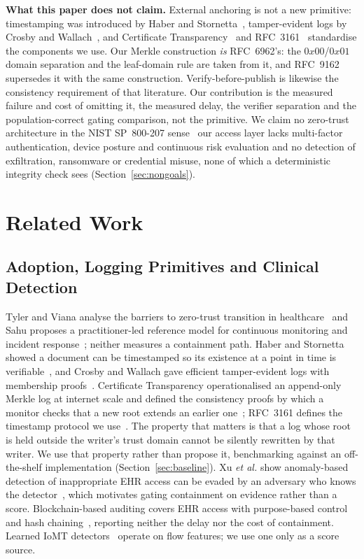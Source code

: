 \documentclass[conference]{IEEEtran}
\begin{document}
\noindent\textbf{What this paper does not claim.} External anchoring is not a new primitive:
timestamping was introduced by Haber and Stornetta~\cite{haber}, tamper-evident logs by Crosby and
Wallach~\cite{crosby}, and Certificate Transparency~\cite{rfc6962} and RFC~3161~\cite{rfc3161}
standardise the components we use. Our Merkle construction \emph{is} RFC~6962's: the $0x00$/$0x01$ domain
separation and the leaf-domain rule are taken from it, and RFC~9162~\cite{rfc9162} supersedes it with the same
construction. Verify-before-publish is likewise the consistency requirement of that literature. Our
contribution is the measured failure and cost of omitting it, the measured delay, the verifier separation and
the population-correct gating comparison, not the primitive. We claim no zero-trust architecture in the NIST
SP~800-207 sense~\cite{nist800207} our access layer lacks multi-factor authentication, device posture and
continuous risk evaluation and no detection of exfiltration, ransomware or credential misuse, none of which
a deterministic integrity check sees (Section~\ref{sec:nongoals}).

\section{Related Work}

\subsection{Adoption, Logging Primitives and Clinical Detection}
Tyler and Viana analyse the barriers to zero-trust transition in healthcare~\cite{tyler} and Sahu
proposes a practitioner-led reference model for continuous monitoring and incident response~\cite{sahu};
neither measures a containment path. Haber and Stornetta showed a document can be timestamped so its
existence at a point in time is verifiable~\cite{haber}, and Crosby and Wallach gave efficient
tamper-evident logs with membership proofs~\cite{crosby}. Certificate Transparency operationalised
an append-only Merkle log at internet scale and defined the consistency proofs by which a monitor checks that a
new root extends an earlier one~\cite{rfc6962,rfc9162}; RFC~3161 defines the timestamp protocol we
use~\cite{rfc3161}. The property that matters is that a log whose root is held outside the writer's trust
domain cannot be silently rewritten by that writer. We use that property rather than propose it, benchmarking
against an off-the-shelf implementation (Section~\ref{sec:baseline}). Xu \emph{et al.} show anomaly-based
detection of inappropriate EHR access can be evaded by an adversary who knows the detector~\cite{usenix23},
which motivates gating containment on evidence rather than a score. Blockchain-based auditing covers EHR access
with purpose-based control~\cite{heliyonAudit,ijisPbac} and hash chaining~\cite{pandey}, reporting neither the
delay nor the cost of containment. Learned IoMT detectors~\cite{waghmode,hbild,safetymed} operate on flow
features; we use one only as a score source.
\end{document}
